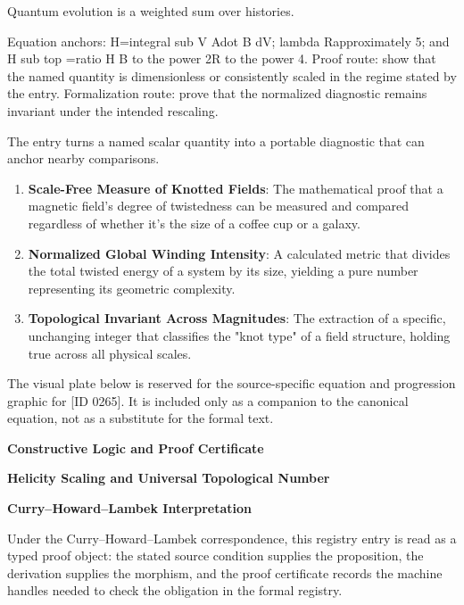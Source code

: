 Quantum evolution is a weighted sum over histories.

Equation anchors: H=integral sub V Adot B dV; lambda Rapproximately 5; and H sub top =ratio H B to the power 2R to the power 4. Proof route: show that the named quantity is dimensionless or consistently scaled in the regime stated by the entry. Formalization route: prove that the normalized diagnostic remains invariant under the intended rescaling.

The entry turns a named scalar quantity into a portable diagnostic that can anchor nearby comparisons.
\endgroup

\begin{enumerate}[leftmargin=1.6em,itemsep=6pt,topsep=4pt]
\item \textbf{Scale-Free Measure of Knotted Fields}: The mathematical proof that a magnetic field's degree of twistedness can be measured and compared regardless of whether it's the size of a coffee cup or a galaxy.
\item \textbf{Normalized Global Winding Intensity}: A calculated metric that divides the total twisted energy of a system by its size, yielding a pure number representing its geometric complexity.
\item \textbf{Topological Invariant Across Magnitudes}: The extraction of a specific, unchanging integer that classifies the "knot type" of a field structure, holding true across all physical scales.
\end{enumerate}

\begingroup\footnotesize\sloppy
The visual plate below is reserved for the source-specific equation and progression graphic for [ID 0265]. It is included only as a companion to the canonical equation, not as a substitute for the formal text.
\par\endgroup
\ifTZPDarkEdition
{}
\fi

\clearpage
\begingroup\tzpsupportsetup
\noindent\textbf{\fontsize{10.8pt}{12.8pt}\selectfont [ID 0265] Constructive Logic and Proof Certificate}\par
\noindent\textbf{\fontsize{10pt}{12pt}\selectfont Helicity Scaling and Universal Topological Number}\par
\vspace{0.45em}
\begingroup
\footnotesize
\setlength{\parskip}{0.22em}
\setlength{\parindent}{0pt}
\noindent\textbf{Curry--Howard--Lambek Interpretation}\par
Under the Curry--Howard--Lambek correspondence, this registry entry is read as a typed proof
object: the stated source condition supplies the proposition, the derivation supplies the
morphism, and the proof certificate records the machine handles needed to check the obligation
in the formal registry.

